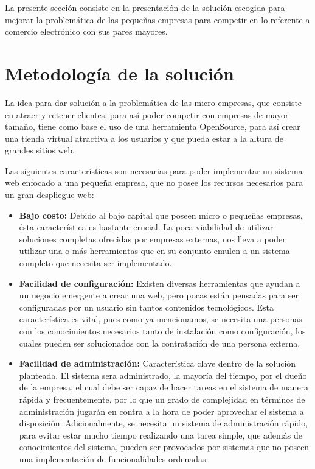 
La presente sección consiste en la presentación de la solución escogida
para mejorar la problemática de las pequeñas empresas para competir en lo
referente a comercio electrónico con sus pares mayores.

\section{Metodología de la solución}
\label{sec:4.1}

La idea para dar solución a la problemática de las micro empresas,
que consiste en atraer y retener clientes, para así poder competir
con empresas de mayor tamaño, tiene como base el uso de una herramienta
OpenSource, para así crear una tienda virtual atractiva a los usuarios
y que pueda estar a la altura de grandes sitios web.

Las siguientes características son necesarias para poder implementar un sistema
web enfocado a una pequeña empresa, que no posee los recursos necesarios
para un gran despliegue web:

\begin{itemize}
    \item {\bf Bajo costo:}
        Debido al bajo capital que poseen micro o pequeñas empresas,
        ésta característica es bastante crucial.
        La poca viabilidad de utilizar soluciones completas ofrecidas
        por empresas externas, nos lleva a poder utilizar una o más herramientas
        que en su conjunto emulen a un sistema completo que necesita ser
        implementado.

    \item {\bf Facilidad de configuración:}
        Existen diversas herramientas que ayudan a un negocio emergente a crear
        una web, pero pocas están pensadas para ser configuradas por un usuario
        sin tantos contenidos tecnológicos.
        Esta característica es vital, pues como ya mencionamos,
        se necesita una personas con los conocimientos necesarios tanto
        de instalación como configuración, los cuales pueden ser solucionados
        con la contratación de una persona externa.

    \item {\bf Facilidad de administración:}
        Característica clave dentro de la solución planteada.
        El sistema sera administrado, la mayoría del tiempo, por el dueño de la
        empresa, el cual debe ser capaz de hacer tareas en el sistema
        de manera rápida y frecuentemente, por lo que un grado
        de complejidad en términos de administración jugarán en contra
        a la hora de poder aprovechar el sistema a disposición.
        Adicionalmente, se necesita un sistema de administración rápido,
        para evitar estar mucho tiempo realizando una tarea simple, que
        además de conocimientos del sistema, pueden ser provocados por sistemas
        que no poseen una implementación de funcionalidades ordenadas.

\end{itemize}

